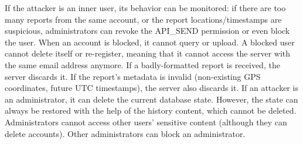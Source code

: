 If the attacker is an inner user, its behavior can be monitored: if there are too many reports from the same account, or the report locations/timestamps are suspicious, administrators can revoke the API\_SEND permission or even block the user. When an account is blocked, it cannot query or upload. A blocked user cannot delete itself or re-register, meaning that it cannot access the server with the same email address anymore. If a badly-formatted report is received, the server discards it. If the report's metadata is invalid (non-existing GPS coordinates, future UTC timestamps), the server also discards it. If an attacker is an administrator, it can delete the current database state. However, the state can always be restored with the help of the history content, which cannot be deleted. Administrators cannot access other users' sensitive content (although they can delete accounts). Other administrators can block an administrator.